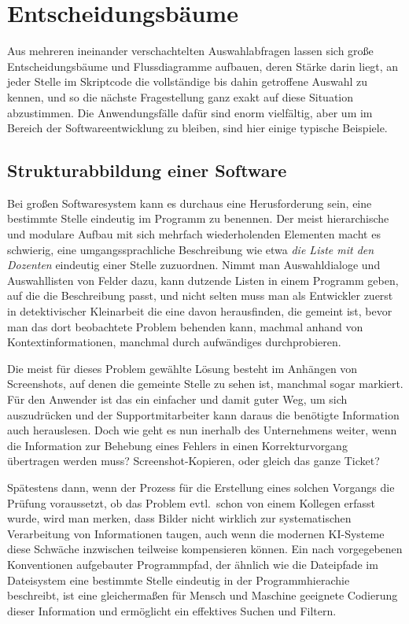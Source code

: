 \chapter{Entscheidungsbäume}
Aus mehreren ineinander verschachtelten Auswahlabfragen lassen sich große Entscheidungsbäume und Flussdiagramme aufbauen, deren Stärke darin liegt, an jeder Stelle im Skriptcode die vollständige bis dahin getroffene Auswahl zu kennen, und so die nächste Fragestellung ganz exakt auf diese Situation abzustimmen. Die Anwendungsfälle dafür sind enorm vielfältig, aber um im Bereich der Softwareentwicklung zu bleiben, sind hier einige typische Beispiele.

\section{Strukturabbildung einer Software}\label{Strukturabbildung}
Bei großen Softwaresystem kann es durchaus eine Herusforderung sein, eine bestimmte Stelle eindeutig im Programm zu benennen. Der meist hierarchische und modulare Aufbau mit sich mehrfach wiederholenden Elementen macht es schwierig, eine umgangssprachliche Beschreibung wie etwa \emph{die Liste mit den Dozenten} eindeutig einer Stelle zuzuordnen. Nimmt man Auswahldialoge und Auswahllisten von Felder dazu, kann dutzende Listen in einem Programm geben, auf die die Beschreibung passt, und nicht selten muss man als Entwickler zuerst in detektivischer Kleinarbeit die eine davon herausfinden, die gemeint ist, bevor man das dort beobachtete Problem behenden kann, machmal anhand von Kontextinformationen, manchmal durch aufwändiges durchprobieren.

Die meist für dieses Problem gewählte Lösung besteht im Anhängen von Screenshots, auf denen die gemeinte Stelle zu sehen ist, manchmal sogar markiert. Für den Anwender ist das ein einfacher und damit guter Weg, um sich auszudrücken und der Supportmitarbeiter kann daraus die benötigte Information auch herauslesen. Doch wie geht es nun inerhalb des Unternehmens weiter, wenn die Information zur Behebung eines Fehlers in einen Korrekturvorgang übertragen werden muss? Screenshot-Kopieren, oder gleich das ganze Ticket?

Spätestens dann, wenn der Prozess für die Erstellung eines solchen Vorgangs die Prüfung voraussetzt, ob das Problem evtl.\ schon von einem Kollegen erfasst wurde, wird man merken, dass Bilder nicht wirklich zur systematischen Verarbeitung von Informationen taugen, auch wenn die modernen KI-Systeme diese Schwäche inzwischen teilweise kompensieren können. Ein nach vorgegebenen Konventionen aufgebauter Programmpfad, der ähnlich wie die Dateipfade im Dateisystem eine bestimmte Stelle eindeutig in der Programmhierachie beschreibt, ist eine gleichermaßen für Mensch und Maschine geeignete Codierung dieser Information und ermöglicht ein effektives Suchen und Filtern.

